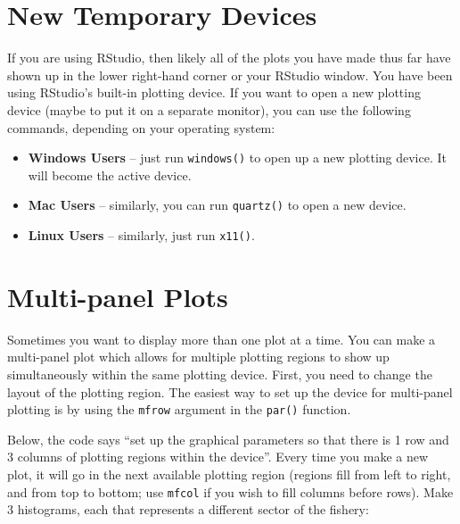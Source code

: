 \documentclass[]{book}
\providecommand{\tightlist}{%
  \setlength{\itemsep}{0pt}\setlength{\parskip}{0pt}}
\begin{document}
\hypertarget{new-temporary-devices}{%
\section{New Temporary Devices}\label{new-temporary-devices}}

If you are using RStudio, then likely all of the plots you have made thus far have shown up in the lower right-hand corner or your RStudio window. You have been using RStudio's built-in plotting device. If you want to open a new plotting device (maybe to put it on a separate monitor), you can use the following commands, depending on your operating system:

\begin{itemize}
\tightlist
\item
  \textbf{Windows Users} -- just run \texttt{windows()} to open up a new plotting device. It will become the active device.
\item
  \textbf{Mac Users} -- similarly, you can run \texttt{quartz()} to open a new device.
\item
  \textbf{Linux Users} -- similarly, just run \texttt{x11()}.
\end{itemize}

\hypertarget{multi-panel-plots}{%
\section{Multi-panel Plots}\label{multi-panel-plots}}

Sometimes you want to display more than one plot at a time. You can make a multi-panel plot which allows for multiple plotting regions to show up simultaneously within the same plotting device. First, you need to change the layout of the plotting region. The easiest way to set up the device for multi-panel plotting is by using the \texttt{mfrow} argument in the \texttt{par()} function.

Below, the code says ``set up the graphical parameters so that there is 1 row and 3 columns of plotting regions within the device''. Every time you make a new plot, it will go in the next available plotting region (regions fill from left to right, and from top to bottom; use \texttt{mfcol} if you wish to fill columns before rows). Make 3 histograms, each that represents a different sector of the fishery:
\end{document}
